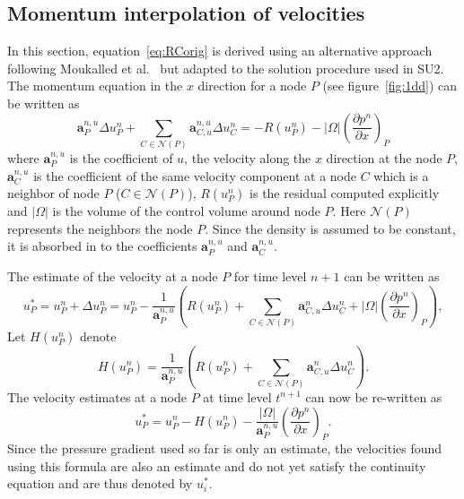 \subsection{Momentum interpolation of velocities}
In this section, equation~\ref{eq:RCorig} is derived using an alternative approach following Moukalled et al.~\cite{Moukalled} but adapted to the solution procedure used in SU2. The momentum equation in the $x$ direction for a node $P$ (see figure~\ref{fig:1dd}) can be written as
\begin{equation*}
\mathbf{a}_{P}^{n,u}\Delta u_{P}^n+\sum_{C \in \mathcal{N}(P)} \mathbf{a}_{C,u}^{n,u}\Delta u_{C}^n=-R(u_{P}^{n})- |\Omega|\left(\frac{\partial p^n}{\partial x}\right)_{P} 
\end{equation*}
where $\mathbf{a}_{P}^{n,u}$ is the coefficient of $u$, the velocity along the $x$ direction at the node $P$, $\mathbf{a}_{C}^{n,u}$ is the coefficient of the same velocity component at a node $C$ which is a neighbor of node $P$ ($C \in \mathcal{N}(P)$), $R(u_{P}^{n})$ is the residual computed explicitly and $|\Omega|$ is the volume of the control volume around node $P$. Here ${\mathcal{N}(P)}$ represents the neighbors the node $P$. Since the density is assumed to be constant, it is absorbed in to the coefficients $\mathbf{a}_{P}^{n,u}$ and $\mathbf{a}_{C}^{n,u}$.

The estimate of the velocity at a node $P$ for time level $n+1$ can be written as 
\begin{equation}
u_{P}^{\ast}=u_{P}^{n}+\Delta u_{P}^n=u_{P}^{n}-\frac{1}{\mathbf{a}_{P}^{n,u}}\left(R(u^{n}_{P})+\sum_{C \in \mathcal{N}(P)} \mathbf{a}_{C,u}^n\Delta u_{C}^n+|\Omega|\left(\frac{\partial p^n}{\partial x}\right)_{P} \right),
\end{equation}
Let $H(u^n_P)$ denote  
\begin{equation*}
H(u^n_P)=\frac{1}{\mathbf{a}_{P}^{n,u}}\left(R(u^{n}_{P})+\sum_{C \in \mathcal{N}(P)} \mathbf{a}_{C,u}^n\Delta u_{C}^n\right).
\end{equation*}
The velocity estimates at a node $P$ at time level $t^{n+1}$ can now be re-written as
\begin{equation}
u_{P}^{\ast} = u_{P}^n - H(u^n_P) - \frac{|\Omega|}{\mathbf{a}_{P}^{n,u}}\left(\frac{\partial p^n}{\partial x}\right)_{P}.
\label{eq:velatP}
\end{equation}
Since the pressure gradient used so far is only an estimate, the velocities found using this formula are also an estimate and do not yet satisfy the continuity equation and are thus denoted by $u^{\ast}_i$. 

